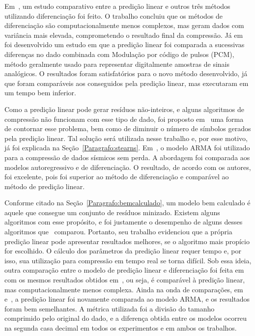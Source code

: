 Em~\citep{Artigo:lpmenosvariancia}, um estudo comparativo entre a predição
linear e outros três métodos utilizando diferenciação foi feito. O trabalho
concluiu que os métodos de diferenciação são computacionalmente menos complexos,
mas geram dados com variância mais elevada, comprometendo o resultado final da
compressão. Já em~\citep{Artigo:lppcm} foi desenvolvido um estudo em que a
predição linear foi comparada a sucessivas diferenças no dado combinada com
Modulação por código de pulsos (PCM), método geralmente usado para representar
digitalmente amostras de sinais analógicos. O resultados foram satisfatórios
para o novo método desenvolvido, já que foram comparáveis aos conseguidos pela
predição linear, mas executaram em um tempo bem inferior.

Como a predição linear pode gerar resíduos não-inteiros, e alguns algoritmos de
compressão não funcionam com esse tipo de dado, foi proposto
em~\citep{Artigo:stearn} uma forma de contornar esse problema, bem como de
diminuir o número de símbolos gerados pela predição linear. Tal solução será
utilizada nesse trabalho e, por esse motivo, já foi explicada na
Seção~\ref{Paragrafo:stearns}. Em~\citep{Artigo:lpearma}, o modelo ARMA foi
utilizado para a compressão de dados sísmicos sem perda. A abordagem foi
comparada aos modelos autoregressivo e de diferenciação. O resultado, de acordo
com os autores, foi excelente, pois foi superior ao método de diferenciação e
comparável ao método de predição linear.

Conforme citado na Seção~\ref{Paragrafo:bemcalculado}, um modelo bem
calculado é aquele que consegue um conjunto de resíduos minizado. Existem alguns
algoritmos com esse propósito, e foi justamente o desempenho de alguns
desses algoritmos que~\citep{Artigo:lpcomparacao} comparou. Portanto, seu
trabalho evidenciou que a própria predição linear pode apresentar resultados
melhores, se o algoritmo mais propício for escolhido. O cálculo dos parâmetros
da predição linear requer tempo e, por isso, sua utilização para compressão em
tempo real se torna difícil. Sob essa ideia, outra comparação entre o modelo de
predição linear e diferenciação foi feita
em~\citep{Artigo:lpediferenciacaodenovo} com os mesmos resultados obtidos
em~\citep{Artigo:lpmenosvariancia}, ou seja, é comparável à predição linear,
mas computacionalmente menos complexa. Ainda na onda de
comparações, em~\citep{Artigo:lparmadenovo} e~\citep{Artigo:lparmadenovo2}, a
predição linear foi novamente comparada ao modelo ARMA, e os resultados foram bem semelhantes. A métrica
utilizada foi a divisão do tamanho comprimido pelo original do dado, e a
diferença obtida entre os modelos ocorreu na segunda casa decimal em todos os
experimentos e em ambos os trabalhos.


